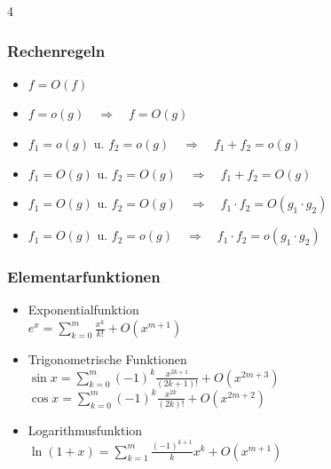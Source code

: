 \documentclass[6pt,a4paper]{scrartcl}
\begin{document}
\begin{multicols*}{4}
    \subsubsection{Rechenregeln}
    \begin{itemize}\itemsep-1pt
        \item $f = O(f)$
        \item $f = o(g) \quad\Rightarrow\quad f = O(g)$
        \item $f_1 = o(g)$ u. $f_2 = o(g) \quad\Rightarrow\quad f_1 + f_2 = o(g)$
        \item $f_1 = O(g)$ u. $f_2 = O(g) \quad\Rightarrow\quad f_1 + f_2 = O(g)$
        \item $f_1 = O(g)$ u. $f_2 = O(g) \quad\Rightarrow\quad f_1 \cdot f_2 = O(g_1 \cdot g_2)$
        \item $f_1 = O(g)$ u. $f_2 = o(g) \quad\Rightarrow\quad f_1 \cdot f_2 = o(g_1 \cdot g_2)$
    \end{itemize}
    \subsubsection{Elementarfunktionen}
    \begin{itemize}\itemsep-1pt
        \item Exponentialfunktion\\
              $e^x = \sum\limits_{k = 0}^m\frac{x^k}{k!} + O(x^{m + 1})$
        \item Trigonometrische Funktionen\\
              $\sin{x} = \sum\limits_{k = 0}^m(-1)^k\frac{x^{2k + 1}}{(2k + 1)!} + O(x^{2m + 3})$\\
              $\cos{x} = \sum\limits_{k = 0}^m(-1)^k\frac{x^{2k}}{(2k)!} + O(x^{2m + 2})$
        \item Logarithmusfunktion\\
              $\ln{(1 + x)} = \sum\limits_{k = 1}^m\frac{(-1)^{k + 1}}{k}x^k + O(x^{m + 1})$
    \end{itemize}



\end{multicols*}
\end{document}
